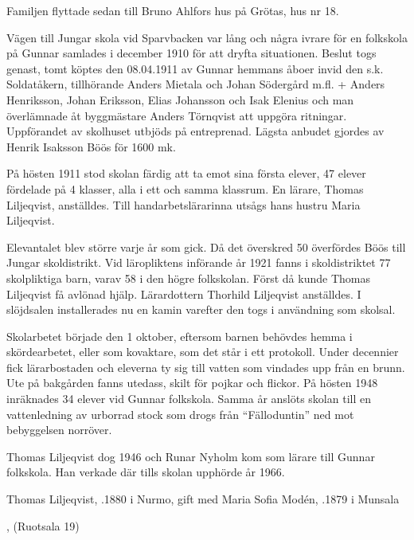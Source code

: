 Familjen flyttade sedan till Bruno Ahlfors hus på Grötas, hus nr 18.


Vägen till Jungar skola vid Sparvbacken var lång och några ivrare för en folkskola på Gunnar samlades i december 1910 för att dryfta situationen. Beslut togs genast, tomt köptes den 08.04.1911 av Gunnar hemmans åboer invid den s.k. Soldatåkern, tillhörande Anders Mietala och Johan Södergård m.fl. + Anders Henriksson, Johan Eriksson, Elias Johansson och Isak Elenius och man överlämnade åt byggmästare Anders Törnqvist att uppgöra ritningar. Uppförandet av skolhuset utbjöds på entreprenad. Lägsta anbudet gjordes av Henrik Isaksson Böös för 1600 mk.

På hösten 1911 stod skolan färdig att ta emot sina första elever, 47 elever fördelade på 4 klasser, alla i ett och samma klassrum. En lärare, Thomas Liljeqvist, anställdes. Till handarbetslärarinna utsågs hans hustru Maria Liljeqvist.

Elevantalet blev större varje år som gick. Då det överskred 50 överfördes Böös till Jungar skoldistrikt. Vid läropliktens införande år 1921 fanns i skoldistriktet 77 skolpliktiga barn, varav 58 i den högre folkskolan. Först då kunde Thomas Liljeqvist få avlönad hjälp. Lärardottern Thorhild Liljeqvist anställdes. I slöjdsalen installerades nu en kamin varefter den togs i användning som skolsal.

Skolarbetet började den 1 oktober, eftersom barnen behövdes hemma i skördearbetet, eller som kovaktare, som det står i ett protokoll. Under decennier fick lärarbostaden och eleverna ty sig till vatten som vindades upp från en brunn. Ute på bakgården fanns utedass, skilt för pojkar och flickor. På hösten 1948 inräknades 34 elever vid Gunnar folkskola. Samma år anslöts skolan till en vattenledning av urborrad stock som drogs från ``Fälloduntin'' ned mot bebyggelsen norröver.

Thomas Liljeqvist dog 1946 och Runar Nyholm kom som lärare till Gunnar folkskola. Han verkade där tills skolan upphörde år 1966.



Thomas Liljeqvist, .1880 i Nurmo, gift med Maria Sofia Modén,  .1879 i Munsala

\begin{jhchildren}
  \item {}
  \item {}
  \item {}
  \item {}
  \item {}, (Ruotsala 19)
\end{jhchildren}

